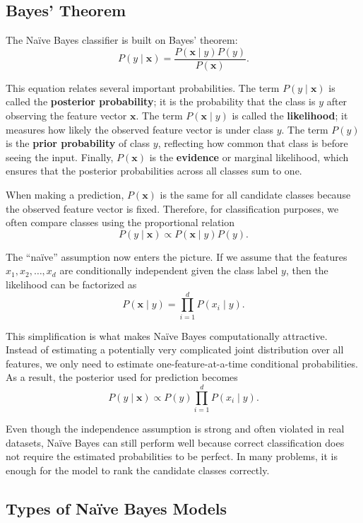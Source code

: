 \documentclass{article}
\begin{document}
\subsection{Bayes' Theorem}

The Na\"ive Bayes classifier is built on Bayes' theorem:
\[
P(y \mid \mathbf{x}) = \frac{P(\mathbf{x} \mid y)P(y)}{P(\mathbf{x})}.
\]

This equation relates several important probabilities. The term \(P(y \mid \mathbf{x})\) is called the \textbf{posterior probability}; it is the probability that the class is \(y\) after observing the feature vector \(\mathbf{x}\). The term \(P(\mathbf{x} \mid y)\) is called the \textbf{likelihood}; it measures how likely the observed feature vector is under class \(y\). The term \(P(y)\) is the \textbf{prior probability} of class \(y\), reflecting how common that class is before seeing the input. Finally, \(P(\mathbf{x})\) is the \textbf{evidence} or marginal likelihood, which ensures that the posterior probabilities across all classes sum to one.

When making a prediction, \(P(\mathbf{x})\) is the same for all candidate classes because the observed feature vector is fixed. Therefore, for classification purposes, we often compare classes using the proportional relation
\[
P(y \mid \mathbf{x}) \propto P(\mathbf{x} \mid y)P(y).
\]

The ``na\"ive'' assumption now enters the picture. If we assume that the features \(x_1, x_2, \dots, x_d\) are conditionally independent given the class label \(y\), then the likelihood can be factorized as
\[
P(\mathbf{x} \mid y) = \prod_{i=1}^{d} P(x_i \mid y).
\]

This simplification is what makes Na\"ive Bayes computationally attractive. Instead of estimating a potentially very complicated joint distribution over all features, we only need to estimate one-feature-at-a-time conditional probabilities. As a result, the posterior used for prediction becomes
\[
P(y \mid \mathbf{x}) \propto P(y)\prod_{i=1}^{d} P(x_i \mid y).
\]

Even though the independence assumption is strong and often violated in real datasets, Na\"ive Bayes can still perform well because correct classification does not require the estimated probabilities to be perfect. In many problems, it is enough for the model to rank the candidate classes correctly.

\subsection{Types of Na\"ive Bayes Models}
\end{document}
